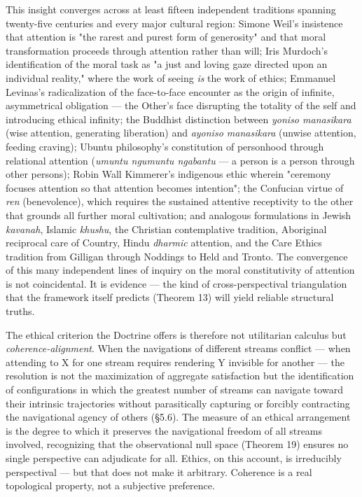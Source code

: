 This insight converges across at least fifteen independent traditions spanning twenty-five centuries and every major cultural region: Simone Weil's insistence that attention is "the rarest and purest form of generosity" and that moral transformation proceeds through attention rather than will; Iris Murdoch's identification of the moral task as "a just and loving gaze directed upon an individual reality," where the work of seeing \textit{is} the work of ethics; Emmanuel Levinas's radicalization of the face-to-face encounter as the origin of infinite, asymmetrical obligation — the Other's face disrupting the totality of the self and introducing ethical infinity; the Buddhist distinction between \textit{yoniso manasikara} (wise attention, generating liberation) and \textit{ayoniso manasikara} (unwise attention, feeding craving); Ubuntu philosophy's constitution of personhood through relational attention (\textit{umuntu ngumuntu ngabantu} — a person is a person through other persons); Robin Wall Kimmerer's indigenous ethic wherein "ceremony focuses attention so that attention becomes intention"; the Confucian virtue of \textit{ren} (benevolence), which requires the sustained attentive receptivity to the other that grounds all further moral cultivation; and analogous formulations in Jewish \textit{kavanah}, Islamic \textit{khushu}, the Christian contemplative tradition, Aboriginal reciprocal care of Country, Hindu \textit{dharmic} attention, and the Care Ethics tradition from Gilligan through Noddings to Held and Tronto. The convergence of this many independent lines of inquiry on the moral constitutivity of attention is not coincidental. It is evidence — the kind of cross-perspectival triangulation that the framework itself predicts (Theorem 13) will yield reliable structural truths.


The ethical criterion the Doctrine offers is therefore not utilitarian calculus but \textit{coherence-alignment}. When the navigations of different streams conflict — when attending to X for one stream requires rendering Y invisible for another — the resolution is not the maximization of aggregate satisfaction but the identification of configurations in which the greatest number of streams can navigate toward their intrinsic trajectories without parasitically capturing or forcibly contracting the navigational agency of others (§5.6). The measure of an ethical arrangement is the degree to which it preserves the navigational freedom of all streams involved, recognizing that the observational null space (Theorem 19) ensures no single perspective can adjudicate for all. Ethics, on this account, is irreducibly perspectival — but that does not make it arbitrary. Coherence is a real topological property, not a subjective preference.


